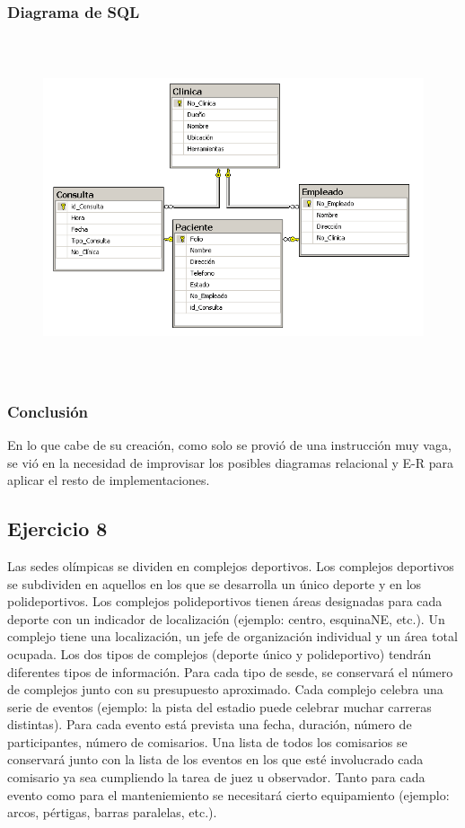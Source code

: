 \documentclass[a4paper, 12pt]{article}
\begin{document}
\begin{justify}
        \subsubsection{Diagrama de SQL}
        \begin{figure}[H]
            \centering
            \includegraphics[width=12cm,height=10cm]{sql7.PNG}
        \end{figure}
        \subsubsection{Conclusión}
        \justify
        En lo que cabe de su creación, como solo se provió de una instrucción muy vaga, se vió en la necesidad de improvisar los posibles diagramas relacional y E-R para aplicar el resto de implementaciones.
        \subsection{Ejercicio 8}
        \justify
        Las sedes olímpicas se dividen en complejos deportivos. Los complejos deportivos se subdividen en aquellos en los que se desarrolla un único deporte y en los polideportivos. Los complejos polideportivos tienen áreas designadas para cada deporte
        con un indicador de localización (ejemplo: centro, esquinaNE, etc.). Un complejo tiene una localización, un jefe de organización individual y un área total ocupada. Los dos tipos de complejos (deporte único y polideportivo) tendrán diferentes tipos de información.
        Para cada tipo de sesde, se conservará el número de complejos junto con su presupuesto aproximado. Cada complejo celebra una serie de eventos (ejemplo: la pista del estadio puede celebrar muchar carreras distintas). Para cada evento está prevista una fecha,
        duración, número de participantes, número de comisarios. Una lista de todos los comisarios se conservará junto con la lista de los eventos en los que esté involucrado cada comisario ya sea cumpliendo la tarea de juez u observador. Tanto para cada evento como para el
        manteniemiento se necesitará cierto equipamiento (ejemplo: arcos, pértigas, barras paralelas, etc.).

\end{justify}
\end{document}

